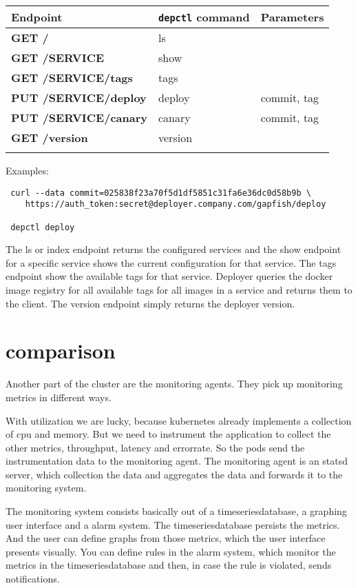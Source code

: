 \begin{table}[!htbp]
  \begin{tabular}{ l|l|l }
    Endpoint & \texttt{depctl} command & Parameters \\
    \hline \hline
    \textbf{GET /} & ls & \\
    \textbf{GET /SERVICE} & show & \\
    \textbf{GET /SERVICE/tags} & tags & \\
    \textbf{PUT /SERVICE/deploy} & deploy & commit, tag \\
    \textbf{PUT /SERVICE/canary} & canary & commit, tag \\
    \textbf{GET /version} & version & \\
    \multicolumn{3}{l}{} %
  \end{tabular}

  Examples:

\begin{verbatim}
 curl --data commit=025838f23a70f5d1df5851c31fa6e36dc0d58b9b \
    https://auth_token:secret@deployer.company.com/gapfish/deploy

 depctl deploy
\end{verbatim}
\end{table}

The ls or index endpoint returns the configured services and the show endpoint for a
specific service shows the current configuration for that service. The tags endpoint show
the available tags for that service. Deployer queries the docker image registry for all
available tags for all images in a service and returns them to the client. The version
endpoint simply returns the deployer version.

\section{comparison}

Another part of the cluster are the monitoring agents. They pick up monitoring metrics in
different ways.

With utilization we are lucky, because kubernetes already implements a collection of cpu
and memory. But we need to instrument the application to collect the other metrics,
throughput, latency and errorrate. So the pods send the instrumentation data to the
monitoring agent. The monitoring agent is an statsd server, which collection the data and
aggregates the data and forwards it to the monitoring system.

The monitoring system consists basically out of a timeseriesdatabase, a graphing user
interface and a alarm system. The timeseriesdatabase persists the metrics. And the user
can define graphs from those metrics, which the user interface presents visually. You can
define rules in the alarm system, which monitor the metrics in the timeseriesdatabase and
then, in case the rule is violated, sends notifications.

